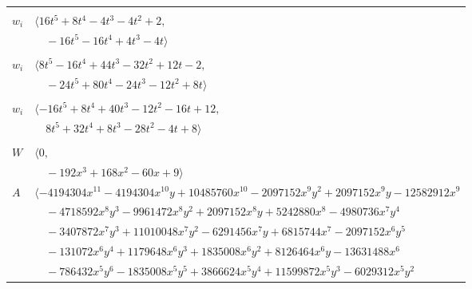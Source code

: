 \documentclass[11pt]{article}
\begin{document}
\begin{longtable}{@{}ll@{}}
\addlinespace[2pt]
\multicolumn{2}{@{}p{0.97\textwidth}@{}}{$i=16$, $D_i=4$, $\rho_{ij}$: $2{:}1, \allowbreak 9{:}2, \allowbreak 12{:}2, \allowbreak 22{:}2, \allowbreak 27{:}1, \allowbreak 45{:}2, \allowbreak 51{:}1, \allowbreak 54{:}1$}\\
$w_i$ & $\langle 16t^{5}+8t^{4}-4t^{3}-4t^{2}+2,$\\
 & $\quad -16t^{5}-16t^{4}+4t^{3}-4t\rangle$\\
\addlinespace[2pt]
\multicolumn{2}{@{}p{0.97\textwidth}@{}}{$i=17$, $D_i=4$, $\rho_{ij}$: $2{:}2, \allowbreak 3{:}1, \allowbreak 19{:}2, \allowbreak 24{:}2, \allowbreak 25{:}2, \allowbreak 27{:}2, \allowbreak 30{:}2, \allowbreak 31{:}2, \allowbreak 50{:}1, \allowbreak 58{:}1, \allowbreak 59{:}2$}\\
$w_i$ & $\langle 8t^{5}-16t^{4}+44t^{3}-32t^{2}+12t-2,$\\
 & $\quad -24t^{5}+80t^{4}-24t^{3}-12t^{2}+8t\rangle$\\
\addlinespace[2pt]
\multicolumn{2}{@{}p{0.97\textwidth}@{}}{$i=18$, $D_i=4$, $\rho_{ij}$: $2{:}2, \allowbreak 3{:}1, \allowbreak 20{:}2, \allowbreak 36{:}1, \allowbreak 39{:}2, \allowbreak 48{:}2, \allowbreak 50{:}2, \allowbreak 52{:}1, \allowbreak 57{:}1, \allowbreak 59{:}2, \allowbreak 62{:}2$}\\
$w_i$ & $\langle -16t^{5}+8t^{4}+40t^{3}-12t^{2}-16t+12,$\\
 & $\quad 8t^{5}+32t^{4}+8t^{3}-28t^{2}-4t+8\rangle$\\
\addlinespace[2pt]
\multicolumn{2}{@{}p{0.97\textwidth}@{}}{$i=19$, $D_i=32$, $\rho_{ij}$: $17{:}1, \allowbreak 20{:}2, \allowbreak 22{:}1, \allowbreak 36{:}1, \allowbreak 41{:}1, \allowbreak 46{:}1, \allowbreak 49{:}1, \allowbreak 57{:}2, \allowbreak 58{:}1, \allowbreak 61{:}2, \allowbreak 63{:}1$}\\
$W$ & $\langle 0,$\\
 & $\quad -192x^{3}+168x^{2}-60x+9\rangle$\\
$A$ & $\langle -4194304x^{11}-4194304x^{10}y+10485760x^{10}-2097152x^{9}y^{2}+2097152x^{9}y-12582912x^{9}$\\
 & $\quad -4718592x^{8}y^{3}-9961472x^{8}y^{2}+2097152x^{8}y+5242880x^{8}-4980736x^{7}y^{4}$\\
 & $\quad -3407872x^{7}y^{3}+11010048x^{7}y^{2}-6291456x^{7}y+6815744x^{7}-2097152x^{6}y^{5}$\\
 & $\quad -131072x^{6}y^{4}+1179648x^{6}y^{3}+1835008x^{6}y^{2}+8126464x^{6}y-13631488x^{6}$\\
 & $\quad -786432x^{5}y^{6}-1835008x^{5}y^{5}+3866624x^{5}y^{4}+11599872x^{5}y^{3}-6029312x^{5}y^{2}$\\

\end{longtable}
\end{document}
